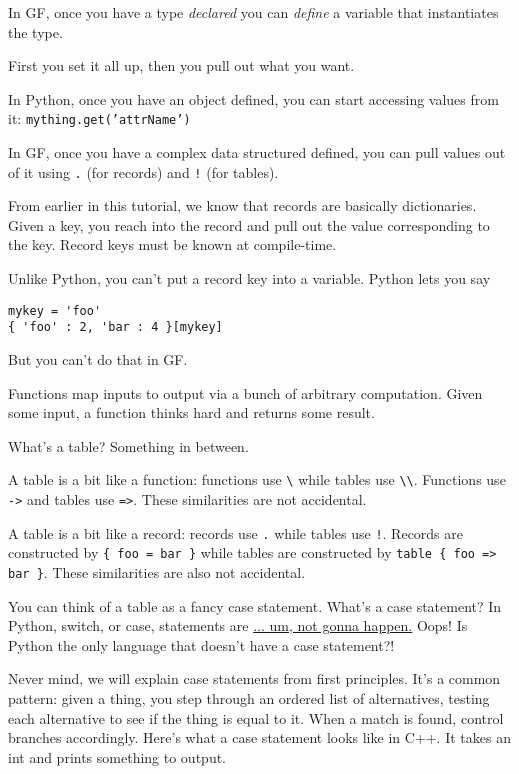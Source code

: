 \documentclass{scrartcl}
\begin{document}
In GF, once you have a type \emph{declared} you can \emph{define} a variable that instantiates the type.

First you set it all up, then you pull out what you want.

In Python, once you have an object defined, you can start accessing values from it: \texttt{mything.get('attrName')}

In GF, once you have a complex data structured defined, you can pull values out of it using \texttt{.} (for records) and \texttt{!} (for tables).

From earlier in this tutorial, we know that records are basically dictionaries. Given a key, you reach into the record and pull out the value corresponding to the key. Record keys must be known at compile-time.

Unlike Python, you can't put a record key into a variable. Python lets you say

\begin{verbatim}
mykey = 'foo'
{ 'foo' : 2, 'bar : 4 }[mykey]
\end{verbatim}

But you can't do that in GF.

Functions map inputs to output via a bunch of arbitrary computation. Given some input, a function thinks hard and returns some result.

What's a table? Something in between.

A table is a bit like a function: functions use \texttt{\textbackslash} while tables use \texttt{\textbackslash\textbackslash}. Functions use \texttt{->} and tables use \texttt{=>}. These similarities are not accidental.

A table is a bit like a record: records use \texttt{.} while tables use \texttt{!}. Records are constructed by \texttt{\{ foo = bar \}} while tables are constructed by \texttt{table \{ foo => bar \}}. These similarities are also not accidental.

You can think of a table as a fancy case statement. What's a case statement? In Python, switch, or case, statements are \href{https://www.python.org/dev/peps/pep-3103/}{... um, not gonna happen.} Oops! Is Python the only language that doesn't have a case statement?!

Never mind, we will explain case statements from first principles. It's a common pattern: given a thing, you step through an ordered list of alternatives, testing each alternative to see if the thing is equal to it. When a match is found, control branches accordingly. Here's what a case statement looks like in C++. It takes an int and prints something to output.
\end{document}
